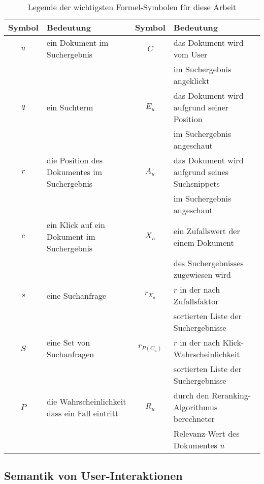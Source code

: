 \begin{table}[H]
\centering
\vspace{-.5em}
\caption[Legende der wichtigsten Formel-Symbolen für diese Arbeit]{Legende der wichtigsten Formel-Symbolen für diese Arbeit}
\label{tab:LegendeSymboleFormeln}
\vspace{-.5em}
\footnotesize
\renewcommand*{\arraystretch}{1.2}
\begin{tabular}{clcl} \hline
\textbf{Symbol} & \textbf{Bedeutung} & \textbf{Symbol} & \textbf{Bedeutung} \\ \hline
$u$	& ein Dokument im Suchergebnis & $C$	& das Dokument wird vom User \\ &&& im Suchergebnis angeklickt \\ 
$q$	& ein Suchterm & $E_{u}$	& das Dokument wird aufgrund seiner Position \\ &&& im Suchergebnis angeschaut \\
$r$	& die Position des Dokumentes im Suchergebnis &  $A_{u}$	& das Dokument wird aufgrund seines Suchsnippets \\ &&& im Suchergebnis angeschaut \\ 
$c$	& ein Klick auf ein Dokument im Suchergebnis & $X_{u}$	& ein Zufallswert der einem Dokument \\ &&& des Suchergebnisses zugewiesen wird \\
$s$ 	& eine Suchanfrage & $r_{X_{u}}$	& $r$ in der nach Zufallsfaktor \\ &&& sortierten Liste der Suchergebnisse \\ 
$S$	& eine Set von Suchanfragen & $r_{P(C_{u})}$ 	& $r$ in der nach Klick-Wahrscheinlichkeit \\ &&& sortierten Liste der Suchergebnisse \\
$P$	& die Wahrscheinlichkeit dass ein Fall eintritt &  $R_{u}$	& durch den Reranking-Algorithmus berechneter \\ &&& Relevanz-Wert des Dokumentes $u$ \\
\hline
\end{tabular}
\vspace{-2em}
\end{table}


\subsection{Semantik von User-Interaktionen}
\label{sec:Grundlagen:Grundbegriffe:SemantikUserInteraktionen}


